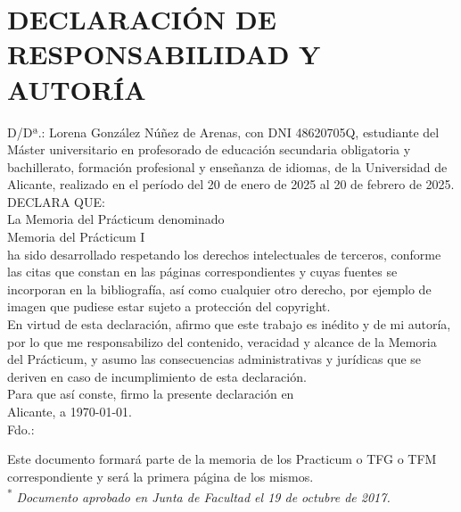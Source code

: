 \newpage
\section*{DECLARACIÓN DE RESPONSABILIDAD Y AUTORÍA}
D/Dª.: Lorena González Núñez de Arenas, con DNI 48620705Q, 
estudiante del Máster universitario en profesorado de educación secundaria obligatoria y bachillerato, formación profesional y enseñanza de idiomas, 
de la Universidad de Alicante, realizado en el período del 20 de enero de 2025 al 20 de febrero de 2025. \\


DECLARA QUE:\\
La Memoria del Prácticum denominado\\
Memoria del Prácticum I\\
ha sido desarrollado respetando los derechos intelectuales de terceros, conforme las citas que 
constan en las páginas correspondientes y cuyas fuentes se incorporan en la bibliografía, así 
como cualquier otro derecho, por ejemplo de imagen que pudiese estar sujeto a protección 
del copyright.\\

En virtud de esta declaración, afirmo que este trabajo es inédito y de mi autoría, por lo que me 
responsabilizo del contenido, veracidad y alcance de la Memoria del Prácticum, y asumo las consecuencias administrativas y jurídicas 
que se deriven en caso de incumplimiento de esta declaración.\\

Para que así conste, firmo la presente declaración en \\
Alicante, a \today. \\

Fdo.:  \
\vspace{10\baselineskip}\

Este documento formará parte de la memoria de los Practicum o TFG o TFM correspondiente y 
será la primera página de los mismos.\\

\textsuperscript{*}	\textit{Documento aprobado en Junta de Facultad el 19 de octubre de 2017.}\\
